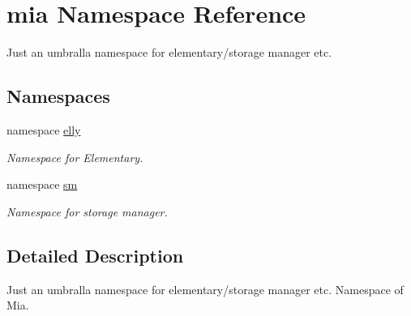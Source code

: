 \hypertarget{namespacemia}{\section{mia Namespace Reference}
\label{namespacemia}
}


Just an umbralla namespace for elementary/storage manager etc.  


\subsection*{Namespaces}
\begin{DoxyCompactItemize}
\item 
namespace \hyperlink{namespacemia_1_1elly}{elly}
\begin{DoxyCompactList}\small\item\em Namespace for Elementary. \end{DoxyCompactList}\item 
namespace \hyperlink{namespacemia_1_1sm}{sm}
\begin{DoxyCompactList}\small\item\em Namespace for storage manager. \end{DoxyCompactList}\end{DoxyCompactItemize}


\subsection{Detailed Description}
Just an umbralla namespace for elementary/storage manager etc. Namespace of Mia. 